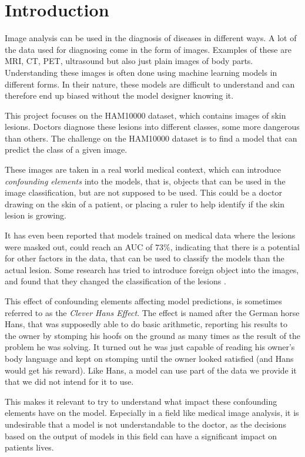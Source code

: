 \chapter{Introduction}\label{sec:introduction}
Image analysis can be used in the diagnosis of diseases in different ways.
A lot of the data used for diagnosing come in the form of images.
Examples of these are MRI, CT, PET, ultrasound but also just plain images of body parts.
Understanding these images is often done using machine learning models in different forms.
In their nature, these models are difficult to understand and can therefore end up biased without
the model designer knowing it.

This project focuses on the HAM10000 dataset\cite{Tschandl_2018}, which contains images of skin lesions.
Doctors diagnose these lesions into different classes, some more dangerous than others.
The challenge on the HAM10000 dataset is to find a model that can predict the class of a given image.

These images are taken in a real world medical context,
which can introduce \textit{confounding elements} into the models,
that is, objects that can be used in the image classification,
but are not supposed to be used.
This could be a doctor drawing on the skin of a patient,
or placing a ruler to help identify if the skin lesion is growing.

It has even been reported that models trained on medical data where the lesions were masked out,
could reach an AUC of $73\%$\cite{DeConstructing_Bias_on_Skin_Lesion_Datasets_2019},
indicating that there is a potential for other factors in the data,
that can be used to classify the models than the actual lesion.
Some research has tried to introduce foreign object into the images,
and found that they changed the classification of the lesions \cite{Towards_Explainable_Classifiers_Using_the_Counterfactual_Approach_2019}.

This effect of confounding elements affecting model predictions, 
is sometimes referred to as the \textit{Clever Hans Effect}.
The effect is named after the German horse Hans,
that was supposedly able to do basic arithmetic,
reporting his results to the owner by stomping his hoofs on the ground as many times as the result of the problem he was solving.
It turned out he was just capable of reading his owner's body language and kept on stomping until the owner looked satisfied (and Hans would get his reward).
Like Hans, a model can use part of the data we provide it that we did not intend for it to use.

This makes it relevant to try to understand what impact these confounding elements have on the model.
Especially in a field like medical image analysis,
it is undesirable that a model is not understandable to the doctor,
as the decisions based on the output of models in this field can have a significant impact on patients lives.